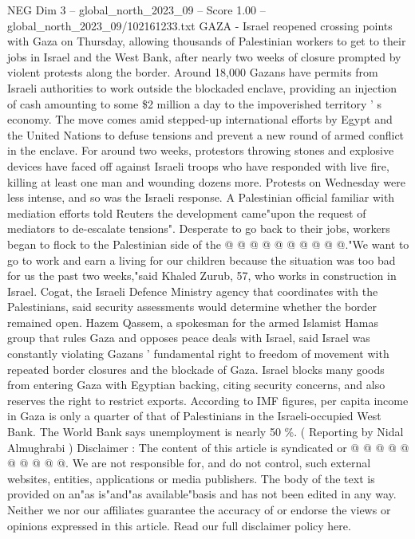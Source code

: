 \begin{textsample}{NEG Dim 3 – global\_north\_2023\_09 – Score 1.00 – global\_north\_2023\_09/102161233.txt}  \label{ex:f3_neg_393}
GAZA - Israel reopened crossing points with Gaza on Thursday, allowing thousands of Palestinian workers to get to their jobs in Israel and the West Bank, after nearly two weeks of closure prompted by violent protests along the border.
Around 18,000 Gazans have permits from Israeli authorities to work outside the blockaded enclave, providing an injection of cash amounting to some \$2 million a day to the impoverished territory ' s economy.
The move comes amid stepped-up international efforts by Egypt and the United Nations to defuse tensions and prevent a new round of armed conflict in the enclave.
For around two weeks, protestors throwing stones and explosive devices have faced off against Israeli troops who have responded with live fire, killing at least one man and wounding dozens more.
Protests on Wednesday were less intense, and so was the Israeli response.
A Palestinian official familiar with mediation efforts told Reuters the development came"upon the request of mediators to de-escalate tensions".
Desperate to go back to their jobs, workers began to flock to the Palestinian side of the @ @ @ @ @ @ @ @ @ @."We want to go to work and earn a living for our children because the situation was too bad for us the past two weeks,"said Khaled Zurub, 57, who works in construction in Israel.
Cogat, the Israeli Defence Ministry agency that coordinates with the Palestinians, said security assessments would determine whether the border remained open.
Hazem Qassem, a spokesman for the armed Islamist Hamas group that rules Gaza and opposes peace deals with Israel, said Israel was constantly violating Gazans ' fundamental right to freedom of movement with repeated border closures and the blockade of Gaza.
Israel blocks many goods from entering Gaza with Egyptian backing, citing security concerns, and also reserves the right to restrict exports.
According to IMF figures, per capita income in Gaza is only a quarter of that of Palestinians in the Israeli-occupied West Bank.
The World Bank says unemployment is nearly 50 \%. ( Reporting by Nidal Almughrabi ) Disclaimer : The content of this article is syndicated or @ @ @ @ @ @ @ @ @ @.
We are not responsible for, and do not control, such external websites, entities, applications or media publishers.
The body of the text is provided on an"as is"and"as available"basis and has not been edited in any way.
Neither we nor our affiliates guarantee the accuracy of or endorse the views or opinions expressed in this article.
Read our full disclaimer policy here.

\end{textsample}
